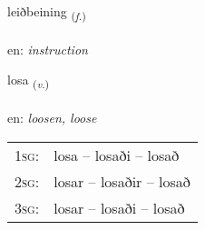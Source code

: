 \documentclass[frontgrid, backgrid]{flacards}\usepackage[]{graphicx}\usepackage[]{color}
\begin{document}
\renewcommand{\flhead}{\vskip5pt \fboxsep=0pt {\small\bfseries\footnotesize Nafnorð | Noun}}
\renewcommand{\fcfoot}{\vskip5pt \fboxsep=0pt \hspace{2pt}{\small\bfseries\footnotesize 2K}}

\renewcommand{\blhead}{\vskip5pt {\small\bfseries\footnotesize Nafnorð | Noun }}
\renewcommand{\bcfoot}{\vskip5pt \hspace{2pt}{\small\bfseries\footnotesize 2K}}


{leiðbeining \small{\textsubscript{(\textit{f.})}} \\[1ex] %
\textphonetic{[leiðpeiniŋk]} \\
en: \emph{instruction} \\  [2ex]
\renewcommand*{\arraystretch}{0.8}
}

\renewcommand{\flhead}{\vskip5pt \fboxsep=0pt {\small\bfseries\footnotesize Sagnorð | Verb}}
\renewcommand{\fcfoot}{\vskip5pt \fboxsep=0pt \hspace{2pt}{\small\bfseries\footnotesize 2K}}

\renewcommand{\blhead}{\vskip5pt {\small\bfseries\footnotesize Sagnorð | Verb }}
\renewcommand{\bcfoot}{\vskip5pt \hspace{2pt}{\small\bfseries\footnotesize 2K}}


{losa \small{\textsubscript{(\textit{v.})}} \\[1ex] %
\textphonetic{[lɔːsa]} \\
en: \emph{loosen, loose} \\  [2ex]
\renewcommand*{\arraystretch}{0.8}
\begin{tabular}{p{1cm}l}
\textsc{1sg}: & losa -- losaði -- losað \\ 
\textsc{2sg}: & losar -- losaðir -- losað \\ 
\textsc{3sg}: & losar -- losaði -- losað \\ 
\end{tabular}
}
\end{document}
